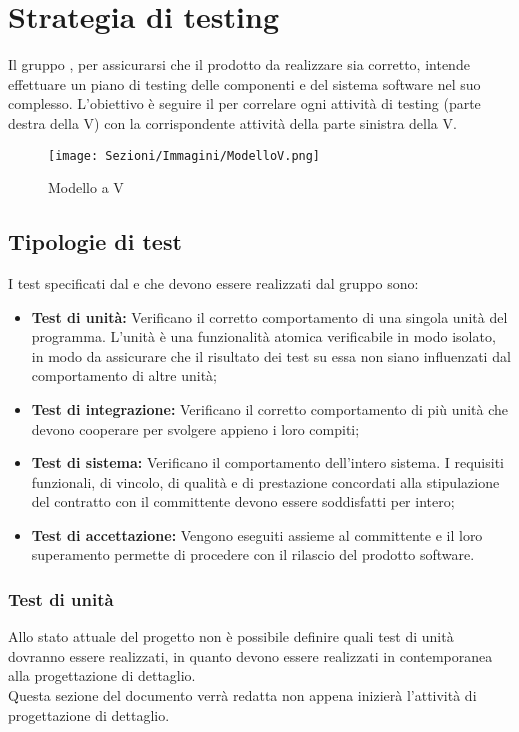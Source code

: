 \section{Strategia di testing}
Il gruppo \Gruppo{}, per assicurarsi che il prodotto da realizzare sia corretto, intende effettuare un piano di testing delle componenti e del sistema software nel suo complesso.
L'obiettivo è seguire il  per correlare ogni attività di testing (parte destra della V) con la corrispondente attività della parte sinistra della V.

\begin{figure}[h]
    \centering
    \texttt{[image: Sezioni/Immagini/ModelloV.png]}
    \caption{Modello a V}
\end{figure}

\subsection{Tipologie di test}
I test specificati dal  e che devono essere realizzati dal gruppo sono:
\begin{itemize}
    \item \textbf{Test di unità:} Verificano il corretto comportamento di una singola unità del programma. L'unità è una funzionalità atomica verificabile in modo isolato, in modo da assicurare che il risultato dei test su essa non siano influenzati dal comportamento di altre unità; 
    \item \textbf{Test di integrazione:} Verificano il corretto comportamento di più unità che devono cooperare per svolgere appieno i loro compiti;
    \item \textbf{Test di sistema:} Verificano il comportamento dell'intero sistema. I requisiti funzionali, di vincolo, di qualità e di prestazione concordati alla stipulazione del contratto con il committente devono essere soddisfatti per intero;
    \item \textbf{Test di accettazione:} Vengono eseguiti assieme al committente e il loro superamento permette di procedere con il rilascio del prodotto software.
\end{itemize}

\subsubsection{Test di unità}
Allo stato attuale del progetto non è possibile definire quali test di unità dovranno essere realizzati, in quanto devono essere realizzati in contemporanea alla progettazione di dettaglio.\\
Questa sezione del documento verrà redatta non appena inizierà l'attività di progettazione di dettaglio.

